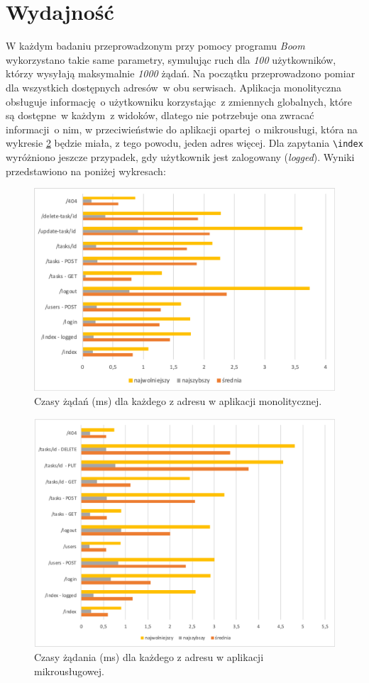 \section{Wydajność}
W każdym badaniu przeprowadzonym przy pomocy programu \textit{Boom} wykorzystano takie same parametry, symulując ruch dla \textit{100} użytkowników, którzy wysyłają maksymalnie \textit{1000} żądań. Na początku przeprowadzono pomiar dla wszystkich dostępnych adresów~w obu serwisach. Aplikacja monolityczna obsługuje informację~o użytkowniku korzystając~z zmiennych globalnych, które są dostępne~w każdym~z widoków, dlatego nie potrzebuje ona zwracać informacji~o nim, w przeciwieństwie do aplikacji opartej~o mikrousługi, która na wykresie \ref{fig:microczasy} będzie miała, z tego powodu, jeden adres więcej. Dla zapytania \verb|\index| wyróżniono jeszcze przypadek, gdy użytkownik jest zalogowany (\textit{logged}). Wyniki przedstawiono na poniżej wykresach:
\begin{figure}[h!]
	\centering
		\includegraphics[width=12cm]{Rysunki/Rozdzial7/mono-zad.png}
		\caption{Czasy żądań (ms) dla każdego z adresu w aplikacji monolitycznej.}
		\label{fig:monoczasy}
	\end{figure}
\begin{figure}[h!]
	\centering
		\includegraphics[width=12cm]{Rysunki/Rozdzial7/micro-zad.png}
		\caption{Czasy żądania (ms) dla każdego z adresu w aplikacji mikrousługowej.}
		\label{fig:microczasy}
	\end{figure}

